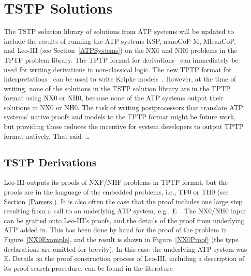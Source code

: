 \documentclass{ceurart}
\begin{document}
\section{TSTP Solutions}
\label{TSTP}

The TSTP solution library of solutions from ATP systems will be updated to include the results 
of running the ATP systems KSP, nanoCoP-M, MleanCoP, and Leo-III (see Section~\ref{ATPSystems}) 
on the NX0 and NH0 problems in the TPTP problem library.
The TPTP format for derivations~\cite{SS+06} can immediately be used for writing derivations in
non-classical logic.
The new TPTP format for interpretations~\cite{SS+23-LPAR} can be used to write Kripke 
models~\cite{Kri63}.
However, at the time of writing, none of the solutions in the TSTP solution library are in the 
TPTP format using NX0 or NH0, because none of the ATP systems output their solutions in NX0 or NH0.
The task of writing postprocessors that translate ATP systems' native proofs and models to the
TPTP format might be future work, but providing those reduces the incentive for system developers
to output TPTP format natively.
That said~\ldots

\subsection{TSTP Derivations}
\label{TSTPDerivations}

Leo-III outputs its proofs of NXF/NHF problems in TPTP format, but the proofs are in the language 
of the embedded problems, i.e., TF0 or TH0 (see Section~\ref{Parsers}).
It is also often the case that the proof includes one large step resulting from a call to an 
underlying ATP system, e.g., E~\cite{SCV19}.
The NX0/NH0 input can be grafted onto Leo-III's proofs, and the details of the proof from 
underlying ATP added in.
This has been done by hand for the proof of the problem in Figure~\ref{NX0Example},
and the result is shown in Figure~\ref{NX0Proof} (the type declarations are omitted for brevity).
In this case the underlying ATP system was E. Details on the proof construction process of Leo-III, 
including a description of its proof search procedure, can be found in the literature~\cite{Ste18,
SB21}
\end{document}
